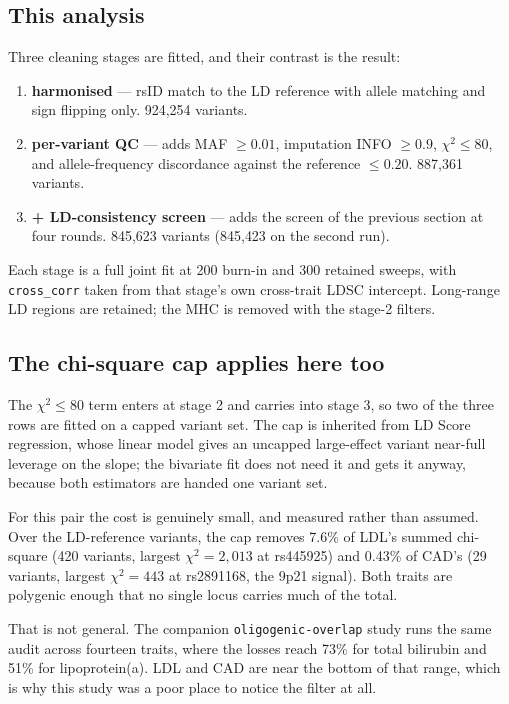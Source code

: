 \subsection*{This analysis}

Three cleaning stages are fitted, and their contrast is the result:

\begin{enumerate}\setlength{\itemsep}{0.3em}
\item \textbf{harmonised} --- rsID match to the LD reference with allele
  matching and sign flipping only. 924{,}254 variants.
\item \textbf{per-variant QC} --- adds MAF $\geq 0.01$, imputation
  INFO $\geq 0.9$, $\chi^2 \leq 80$, and allele-frequency discordance against
  the reference $\leq 0.20$. 887{,}361 variants.
\item \textbf{+ LD-consistency screen} --- adds the screen of the previous
  section at four rounds. 845{,}623 variants (845{,}423 on the second run).
\end{enumerate}

Each stage is a full joint fit at 200 burn-in and 300 retained sweeps, with
\texttt{cross\_corr} taken from that stage's own cross-trait LDSC intercept.
Long-range LD regions are retained; the MHC is removed with the stage-2
filters.

\subsection*{The chi-square cap applies here too}

The $\chi^2 \leq 80$ term enters at stage 2 and carries into stage 3, so two of
the three rows are fitted on a capped variant set. The cap is inherited from LD
Score regression, whose linear model gives an uncapped large-effect variant
near-full leverage on the slope; the bivariate fit does not need it and gets it
anyway, because both estimators are handed one variant set.

For this pair the cost is genuinely small, and measured rather than assumed.
Over the LD-reference variants, the cap removes 7.6\% of LDL's summed
chi-square (420 variants, largest $\chi^2 = 2{,}013$ at rs445925) and 0.43\% of
CAD's (29 variants, largest $\chi^2 = 443$ at rs2891168, the 9p21 signal). Both
traits are polygenic enough that no single locus carries much of the total.

That is not general. The companion \texttt{oligogenic-overlap} study runs the
same audit across fourteen traits, where the losses reach 73\% for total
bilirubin and 51\% for lipoprotein(a). LDL and CAD are near the bottom of that
range, which is why this study was a poor place to notice the filter at all.

